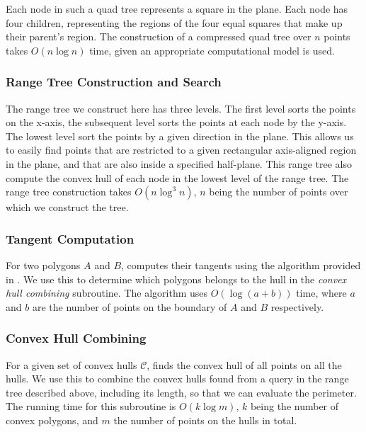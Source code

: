 \documentclass{article}
\begin{document}
Each node in such a quad tree represents a square in the plane. Each node has four children, representing the regions of the four equal squares that make up their parent's region. The construction of a compressed quad tree over $n$ points takes $O(n \log n)$ time, given an appropriate computational model is used.

\subsubsection{Range Tree Construction and Search} \label{subsub:range_tree_construction_and_search}

The range tree we construct here has three levels. The first level sorts the points on the x-axis, the subsequent level sorts the points at each node by the y-axis. The lowest level sort the points by a given direction in the plane. This allows us to easily find points that are restricted to a given rectangular axis-aligned region in the plane, and that are also inside a specified half-plane. This range tree also compute the convex hull of each node in the lowest level of the range tree. The range tree construction takes $O(n\log^3n)$, $n$ being the number of points over which we construct the tree.

\subsubsection{Tangent Computation} \label{subsub:tangent_computation}

For two polygons $A$ and $B$, computes their tangents using the algorithm provided in \cite{ks95}. We use this to determine which polygons belongs to the hull in the \textit{convex hull combining} subroutine. The algorithm uses $O(\log(a + b))$ time, where $a$ and $b$ are the number of points on the boundary of $A$ and $B$ respectively.

\subsubsection{Convex Hull Combining}
For a given set of convex hulls $\mathcal{C}$, finds the convex hull of all points on all the hulls. We use this to combine the convex hulls found from a query in the range tree described above, including its length, so that we can evaluate the perimeter. The running time for this subroutine is $O(k \log m)$, $k$ being the number of convex polygons, and $m$ the number of points on the hulls in total.
\end{document}
